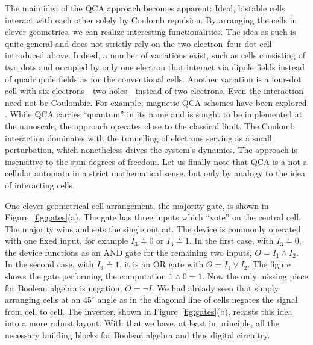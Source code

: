 The main idea of the QCA approach becomes apparent: Ideal, bistable cells
interact with each other solely by Coulomb repulsion. By arranging the cells in
clever geometries, we can realize interesting functionalities. The idea as such
is quite general and does not strictly rely on the two-electron--four-dot cell
introduced above. Indeed, a number of variations exist, such as cells consisting
of two dots and occupied by only one electron that interact via dipole fields
instead of quadrupole fields as for the conventional cells. Another variation is
a four-dot cell with six electrons---two holes---instead of two electrons. Even
the interaction need not be Coulombic. For example, magnetic QCA schemes have
been explored \cite{bernstein2005magnetic}. While QCA carries ``quantum'' in its
name and is sought to be implemented at the nanoscale, the approach operates
close to the classical limit. The Coulomb interaction dominates with the
tunnelling of electrons serving as a small perturbation, which nonetheless
drives the system's dynamics. The approach is insensitive to the spin degrees of
freedom. Let us finally note that QCA is a not a cellular automata in a strict
mathematical sense, but only by analogy to the idea of interacting cells.

One clever geometrical cell arrangement, the majority gate, is shown in
Figure~\ref{fig:gates}(a). The gate has three inputs which ``vote'' on the
central cell. The majority wins and sets the single output. The device is
commonly operated with one fixed input, for example $I_3 \doteq 0$ or $I_3
\doteq 1$. In the first case, with $I_3 \doteq 0$, the device functions as an
AND gate for the remaining two inputs, $O = I_1 \land I_2$. In the second case,
with $I_3 \doteq 1$, it is an OR gate with $O = I_1 \lor I_2$. The figure shows
the gate performing the computation $1 \land 0 = 1$. Now the only missing piece
for Boolean algebra is negation, $O = \lnot I$. We had already seen that simply
arranging cells at an $45^{\circ}$ angle as in the diagonal line of cells
negates the signal from cell to cell. The inverter, shown in
Figure~\ref{fig:gates}(b), recasts this idea into a more robust layout. With
that we have, at least in principle, all the necessary building blocks for
Boolean algebra and thus digital circuitry.

